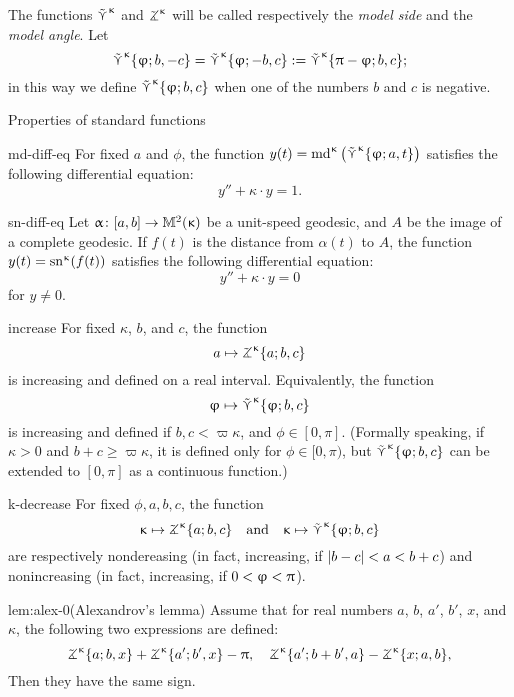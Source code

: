 The functions $\mathop{\tilde\curlyvee}\nolimits^{\upkappa}$ and $\tangle\mc\kappa$ will be called respectively the \emph{model side} and the \emph{model angle}.
Let 
\[
\mathop{\tilde\curlyvee}\nolimits^{\upkappa}\{\upvarphi;b,-c\}
=\mathop{\tilde\curlyvee}\nolimits^{\upkappa}\{\upvarphi;-b,c\}
:=\mathop{\tilde\curlyvee}\nolimits^{\upkappa}\{\uppi-\upvarphi;b,c\};\]
in this way we define $\mathop{\tilde\curlyvee}\nolimits^{\upkappa}\{\upvarphi;b,c\}$ when one of the numbers $b$ and $c$ is negative. %

\pagebreak%

\begin{thm}{Properties of standard functions}\label{md-equalities}

\begin{subthm}{md-diff-eq}
For fixed $a$ and $\phi$, the function $y(t)=\mathrm{md}^{\upkappa}\left(\mathop{\tilde\curlyvee}\nolimits^{\upkappa}\{\upvarphi;a,t\}\right)$
 satisfies the following differential equation:
\[y''+\kappa\cdot y=1.\]
\end{subthm}

\begin{subthm}{sn-diff-eq}
Let $\alpha\:[a,b]\to\Lob2\kappa$ be a unit-speed geodesic, and $A$ be the image of a complete geodesic. If $f(t)$ is the distance from $\alpha(t)$ to $A$, the function 
$y(t)=\mathrm{sn}^{\upkappa} (f(t))$
 satisfies the following differential equation:
\[y''+\kappa\cdot y=0\]
for $y\ne 0$.
\end{subthm}

\begin{subthm}{increase}
For fixed $\kappa$, $b$, and $c$, the function 
\[a\mapsto\tangle\mc\kappa\{a;b,c\}\]
is increasing and defined on a real interval.
Equivalently, the function
\[\phi\mapsto\side\kappa \{\phi;b,c\}\]
is increasing and defined if $b,c<\varpi\kappa$, and $\phi\in[0,\pi]$.
(Formally speaking, if $\kappa>0$ and $b+c\ge \varpi\kappa$, it is defined only for $\phi\in[0,\pi)$, but $\mathop{\tilde\curlyvee}\nolimits^{\upkappa} \{\upvarphi;b,c\}$ can be extended to $[0,\pi]$ as a continuous function.)
\end{subthm}

\begin{subthm}{k-decrease}
For fixed $\phi,a,b,c$, the function
\[\kappa\mapsto \tangle\mc\kappa\{a;b,c\}\quad \text{and}\quad \kappa\mapsto \side\kappa \{\phi;b,c\}\]
are respectively nondereasing (in fact, increasing, if $|b\z-c|\z<a\z< b+c$)
and nonincreasing (in fact, increasing, if $0\z<\phi\z<\pi$).
\end{subthm}

\begin{subthm}{lem:alex-0}(Alexandrov's lemma)
Assume that for real numbers $a$, $b$, $a'$, $b'$, $x$, and $\kappa$, the following two expressions are defined:
\[\tangle\mc\kappa\{a;b,x\}+\tangle\mc\kappa\{a';b',x\}-\pi,\quad
\tangle\mc\kappa\{a';b+b',a\}-\tangle\mc\kappa\{x;a,b\},\]
Then they have the same sign.
\end{subthm}
\end{thm}

